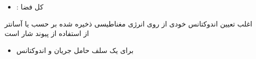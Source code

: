 \begin{ELjoin}

\begin{itemize}
\tightlist
\item
  : کل فضا
\end{itemize}

\begin{ELremark}{}

اغلب تعیین اندوکتانس خودی از روی انرژی مغناطیسی ذخیره شده بر حسب  یا  آسانتر از استفاده از پیوند شار است


\begin{itemize}
\tightlist
\item
  برای یک سلف حامل جریان  و اندوکتانس 
\end{itemize}


\end{ELremark}

\end{ELjoin}


